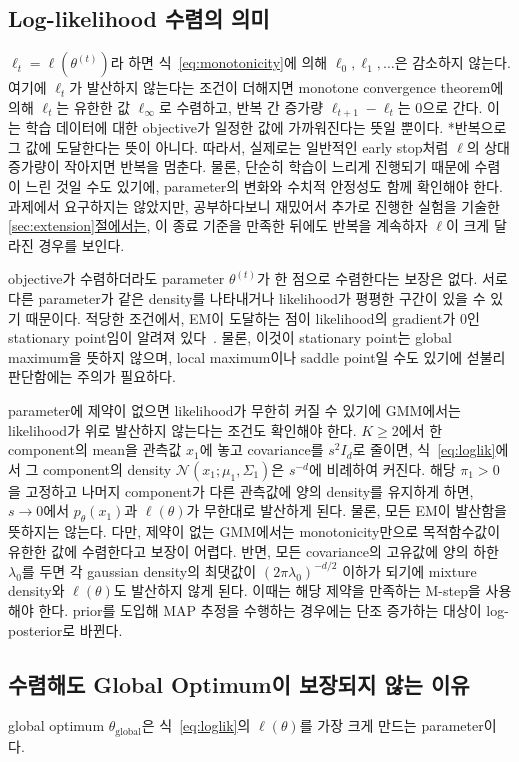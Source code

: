 \documentclass[a4paper,11pt]{article}
\DeclareRobustCommand{\seclink}[3]{\hyperref[#2]{\ref*{#1}#3}\hspace{0pt}}
\newcommand{\Normal}{\mathcal{N}}
\numberwithin{equation}{section}
\begin{document}
\subsection{Log-likelihood 수렴의 의미}
\label{sec:loglik}
$\ell_t=\ell(\theta^{(t)})$라 하면 식~\eqref{eq:monotonicity}에 의해
$\ell_0,\ell_1,\ldots$은 감소하지 않는다. 여기에 $\ell_t$가 발산하지 않는다는 조건이 더해지면
monotone convergence theorem에 의해 $\ell_t$는 유한한 값 $\ell_\infty$로 수렴하고,
반복 간 증가량 $\ell_{t+1}-\ell_t$는 0으로 간다.
이는 학습 데이터에 대한 objective가 일정한 값에 가까워진다는 뜻일 뿐이다.
*반복으로 그 값에 도달한다는 뜻이 아니다.
따라서, 실제로는 일반적인 early stop처럼 $\ell$의 상대 증가량이 작아지면 반복을 멈춘다.
물론, 단순히 학습이 느리게 진행되기 때문에 수렴이 느린 것일 수도 있기에, 
parameter의 변화와 수치적 안정성도 함께 확인해야 한다.
과제에서 요구하지는 않았지만, 공부하다보니 재밌어서 추가로 진행한 실험을 기술한 \seclink{sec:extension}{sec:conv-record}{절에서는}, 이 종료 기준을 만족한 뒤에도 반복을 계속하자 $\ell$이 크게 달라진 경우를 보인다.

objective가 수렴하더라도 parameter $\theta^{(t)}$가 한 점으로 수렴한다는 보장은 없다.
서로 다른 parameter가 같은 density를 나타내거나 likelihood가 평평한 구간이 있을 수
있기 때문이다. 적당한 조건에서, EM이 도달하는 점이 likelihood의 gradient가
0인 stationary point임이 알려져 있다~\citep{wu1983}.
물론, 이것이 stationary point는 global maximum을 뜻하지 않으며,
local maximum이나 saddle point일 수도 있기에 섣불리 판단함에는 주의가 필요하다.

parameter에 제약이 없으면 likelihood가 무한히 커질 수 있기에 GMM에서는 likelihood가 위로 발산하지 않는다는 조건도 확인해야 한다.
$K\geq2$에서 한 component의 mean을 관측값 $x_1$에 놓고 covariance를 $s^2I_d$로 줄이면,
식~\eqref{eq:loglik}에서 그 component의 density $\Normal(x_1;\mu_1,\Sigma_1)$은 $s^{-d}$에 비례하여 커진다. 해당 $\pi_1>0$을 고정하고 나머지 component가 다른 관측값에 양의 density를 유지하게 하면, $s\to0$에서 $p_\theta(x_1)$과 $\ell(\theta)$가 무한대로 발산하게 된다.
물론, 모든 EM이 발산함을 뜻하지는 않는다. 다만, 제약이 없는 GMM에서는
monotonicity만으로 목적함수값이 유한한 값에 수렴한다고 보장이 어렵다.
반면, 모든 covariance의 고유값에 양의 하한 $\lambda_0$를 두면
각 gaussian density의 최댓값이 $(2\pi\lambda_0)^{-d/2}$ 이하가 되기에
mixture density와 $\ell(\theta)$도 발산하지 않게 된다.
이때는 해당 제약을 만족하는 M-step을 사용해야 한다.
prior를 도입해 MAP 추정을 수행하는 경우에는 단조 증가하는 대상이 log-posterior로 바뀐다.

\subsection{수렴해도 Global Optimum이 보장되지 않는 이유}
global optimum $\theta_{\mathrm{global}}$은 식~\eqref{eq:loglik}의 $\ell(\theta)$를
가장 크게 만드는 parameter이다.
\end{document}
